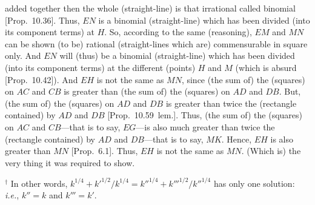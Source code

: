 \begin{Parallel}{}{}
{added together then the whole (straight-line) is that irrational called
binomial [Prop.~10.36]. Thus, $EN$
is a binomial (straight-line) which has been divided (into its component terms) at $H$. So, according to
the same (reasoning), $EM$ and $MN$ can be shown (to be) rational
(straight-lines which are) commensurable in square only. And $EN$
will (thus) be a binomial (straight-line) which has been divided (into its component terms) at the different (points)
$H$ and $M$ (which is absurd [Prop.~10.42]).
And $EH$ is not the same as $MN$, since (the sum of) the
(squares) on $AC$ and $CB$ is greater than (the sum of) the (squares) on
$AD$ and $DB$. But, (the sum of) the (squares) on $AD$ and $DB$
is greater than twice the (rectangle contained) by $AD$ and $DB$ [Prop.~10.59~lem.]. Thus,  (the sum of) the (squares) on $AC$ and $CB$---that is to say, $EG$---is also much greater than twice the (rectangle contained) by 
$AD$ and $DB$---that is to say, $MK$. Hence, $EH$ is also greater
than $MN$ [Prop.~6.1]. Thus, $EH$ is not the same as $MN$. (Which is) the very thing
it was required to show.}
\end{Parallel}
{\footnotesize\noindent$^\dag$ In other words, $k^{1/4}+k'^{1/2}/k^{1/4}
= k''^{1/4}+k'''^{1/2}/k''^{1/4}$
has only one solution: {\em i.e.}, $k''=k$ and $k'''=k'$.}

